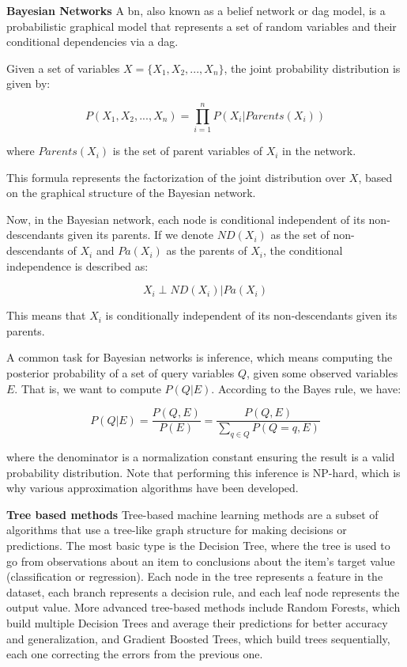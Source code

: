 \textbf{Bayesian Networks}
A \ac{bn}, also known as a belief network or \ac{dag} model, is a probabilistic graphical model that represents a set of random variables and their conditional dependencies via a \ac{dag}. 

Given a set of variables \(X = \{X_1, X_2, ..., X_n\}\), the joint probability distribution is given by:

\[
P(X_1, X_2, ..., X_n) = \prod_{i=1}^{n} P(X_i | Parents(X_i))
\]

where \(Parents(X_i)\) is the set of parent variables of \(X_i\) in the network.

This formula represents the factorization of the joint distribution over \(X\), based on the graphical structure of the Bayesian network.

Now, in the Bayesian network, each node is conditional independent of its non-descendants given its parents. If we denote \(ND(X_i)\) as the set of non-descendants of \(X_i\) and \(Pa(X_i)\) as the parents of \(X_i\), the conditional independence is described as:

\[
X_i \perp ND(X_i) | Pa(X_i)
\]

This means that \(X_i\) is conditionally independent of its non-descendants given its parents. 

A common task for Bayesian networks is inference, which means computing the posterior probability of a set of query variables \(Q\), given some observed variables \(E\). That is, we want to compute \(P(Q|E)\). According to the Bayes rule, we have:

\[
P(Q|E) = \frac{P(Q,E)}{P(E)} = \frac{P(Q,E)}{\sum_{q \in Q} P(Q=q,E)}
\]

where the denominator is a normalization constant ensuring the result is a valid probability distribution. Note that performing this inference is NP-hard, which is why various approximation algorithms have been developed.

\textbf{Tree based methods}
Tree-based machine learning methods are a subset of algorithms that use a tree-like graph structure for making decisions or predictions. The most basic type is the Decision Tree, where the tree is used to go from observations about an item to conclusions about the item's target value (classification or regression). Each node in the tree represents a feature in the dataset, each branch represents a decision rule, and each leaf node represents the output value. More advanced tree-based methods include Random Forests, which build multiple Decision Trees and average their predictions for better accuracy and generalization, and Gradient Boosted Trees, which build trees sequentially, each one correcting the errors from the previous one.

